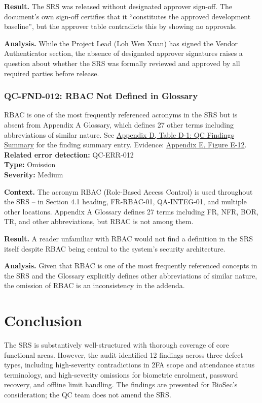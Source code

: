 \documentclass[11pt,a4paper]{article}
\let\orighyperref\hyperref
\renewcommand{\hyperref}[2][]{\orighyperref[#1]{\uline{#2}}}
\begin{document}
\textbf{Result.} The SRS was released without designated approver sign-off. The document's own sign-off certifies that it ``constitutes the approved development baseline'', but the approver table contradicts this by showing no approvals.

\textbf{Analysis.} While the Project Lead (Loh Wen Xuan) has signed the Vendor Authenticator section, the absence of designated approver signatures raises a question about whether the SRS was formally reviewed and approved by all required parties before release.

\subsubsection*{QC-FND-012: RBAC Not Defined in Glossary}
RBAC is one of the most frequently referenced acronyms in the SRS but is absent from Appendix A Glossary, which defines 27 other terms including abbreviations of similar nature. See \hyperref[tab:qc-findings-summary]{Appendix D, Table D-1: QC Findings Summary} for the finding summary entry. Evidence: \hyperref[fig:evidence-012]{Appendix E, Figure E-12}. \\
\textbf{Related error detection:} QC-ERR-012 \\
\textbf{Type:} Omission \\
\textbf{Severity:} Medium

\textbf{Context.} The acronym RBAC (Role-Based Access Control) is used throughout the SRS -- in Section 4.1 heading, FR-RBAC-01, QA-INTEG-01, and multiple other locations. Appendix A Glossary defines 27 terms including FR, NFR, BOR, TR, and other abbreviations, but RBAC is not among them.

\textbf{Result.} A reader unfamiliar with RBAC would not find a definition in the SRS itself despite RBAC being central to the system's security architecture.

\textbf{Analysis.} Given that RBAC is one of the most frequently referenced concepts in the SRS and the Glossary explicitly defines other abbreviations of similar nature, the omission of RBAC is an inconsistency in the addenda.

\section{Conclusion}

The SRS is substantively well-structured with thorough coverage of core functional areas. However, the audit identified 12 findings across three defect types, including high-severity contradictions in 2FA scope and attendance status terminology, and high-severity omissions for biometric enrolment, password recovery, and offline limit handling. The findings are presented for BioSec's consideration; the QC team does not amend the SRS.
\end{document}
